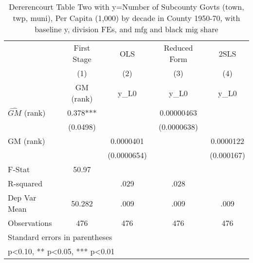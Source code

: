 \begin{table}[htbp]\centering
\def\sym#1{\ifmmode^{#1}\else\(^{#1}\)\fi}
\caption{Dererencourt Table Two with y=Number of Subcounty Govts (town, twp, muni), Per Capita (1,000) by decade in County 1950-70, with baseline y, division FEs, and mfg and black mig share}
\begin{tabular}{l*{4}{c}}
\toprule
                    & First Stage   &         OLS   &Reduced Form   &        2SLS   \\
                    &\multicolumn{1}{c}{(1)}&\multicolumn{1}{c}{(2)}&\multicolumn{1}{c}{(3)}&\multicolumn{1}{c}{(4)}\\
                    &\multicolumn{1}{c}{GM  (rank)}&\multicolumn{1}{c}{y\_L0}&\multicolumn{1}{c}{y\_L0}&\multicolumn{1}{c}{y\_L0}\\
\midrule
$\hat{GM}$ (rank)   &       0.378***&               &  0.00000463   &               \\
                    &    (0.0498)   &               & (0.0000638)   &               \\
\addlinespace
GM  (rank)          &               &   0.0000401   &               &   0.0000122   \\
                    &               & (0.0000654)   &               &  (0.000167)   \\
\midrule
F-Stat              &       50.97   &               &               &               \\
R-squared           &               &        .029   &        .028   &               \\
Dep Var Mean        &      50.282   &        .009   &        .009   &        .009   \\
Observations        &         476   &         476   &         476   &         476   \\
\bottomrule
\multicolumn{5}{l}{\footnotesize Standard errors in parentheses}\\
\multicolumn{5}{l}{\footnotesize * p<0.10, ** p<0.05, *** p<0.01}\\
\end{tabular}
\end{table}
